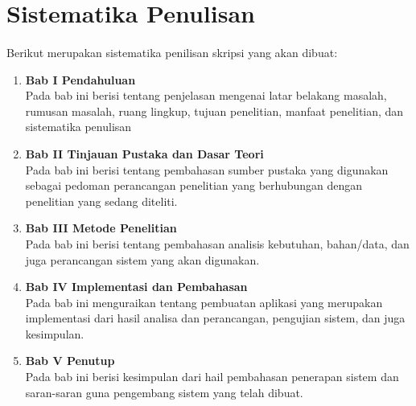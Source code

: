 \documentclass[./bab_1.tex]{subfiles}
\begin{document}
\section{Sistematika Penulisan}
\paragraph*{}Berikut merupakan sistematika penilisan skripsi
yang akan dibuat:

\begin{enumerate}
  \item\textbf{Bab I Pendahuluan}\\
  Pada bab ini berisi tentang penjelasan
  mengenai latar belakang masalah, rumusan masalah, ruang
  lingkup, tujuan penelitian, manfaat penelitian, dan
  sistematika penulisan

  \item\textbf{Bab II Tinjauan Pustaka dan Dasar Teori}\\
  Pada bab ini berisi tentang pembahasan sumber pustaka yang
  digunakan sebagai pedoman perancangan penelitian yang
  berhubungan dengan penelitian yang sedang diteliti.

  \item\textbf{Bab III Metode Penelitian}\\
  Pada bab ini berisi tentang pembahasan analisis kebutuhan,
  bahan/data, dan juga perancangan sistem yang akan
  digunakan.

  \item\textbf{Bab IV Implementasi dan Pembahasan}\\
  Pada bab ini menguraikan tentang pembuatan aplikasi yang
  merupakan implementasi dari hasil analisa dan perancangan,
  pengujian sistem, dan juga kesimpulan.

  \item\textbf{Bab V Penutup}\\
  Pada bab ini berisi kesimpulan dari hail pembahasan
  penerapan sistem dan saran-saran guna pengembang sistem
  yang telah dibuat.
\end{enumerate}
\end{document}
